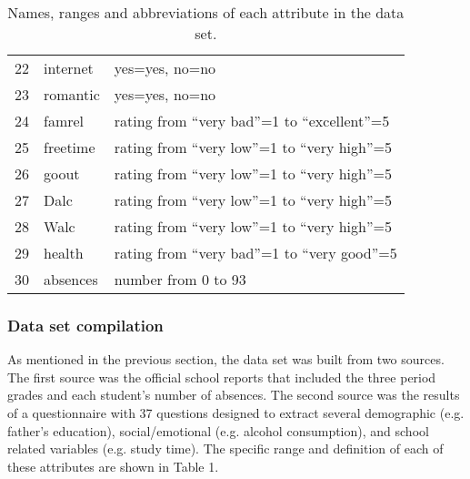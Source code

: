 \begin{table}
\begin{tabular} {m{1em} m{1.5cm} m{9cm}}
22 & internet & yes=yes, no=no \\
23 & romantic & yes=yes, no=no \\
24 & famrel & rating from ``very bad''=1 to ``excellent''=5 \\
25 & freetime & rating from ``very low''=1 to ``very high''=5 \\
26 & goout & rating from ``very low''=1 to ``very high''=5 \\
27 & Dalc & rating from ``very low''=1 to ``very high''=5 \\
28 & Walc & rating from ``very low''=1 to ``very high''=5 \\
29 & health & rating from ``very bad''=1 to ``very good''=5 \\
30 & absences & number from 0 to 93 \\
 \hline
\end{tabular}
\caption{Names, ranges and abbreviations of each attribute in the data set.}
\label{table:attributes}
\end{table}
\subsubsection{Data set compilation}
As mentioned in the previous section, the data set was built from two sources. The first source was the official school reports that included the three period grades and each student's number of absences. The second source was the results of a questionnaire with 37 questions designed to extract several demographic (e.g. father's education), social/emotional (e.g. alcohol consumption), and school related variables (e.g. study time). The specific range and definition of each of these attributes are shown in Table 1.

